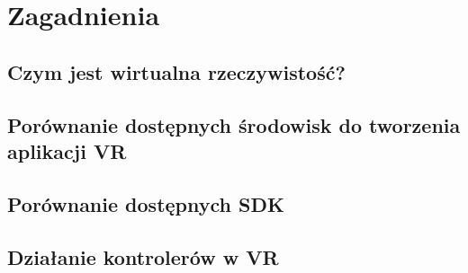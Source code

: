 \chapter{Zagadnienia}
\label{ch:zagadnienia}


\section{Czym jest wirtualna rzeczywistość?}
\label{sec:vr}

\section{Porównanie dostępnych środowisk do tworzenia aplikacji VR}
\label{sec:enviroment}

\section{Porównanie dostępnych SDK}
\label{sec:sdk}

\section{Działanie kontrolerów w VR}
\label{sec:kontroleryVR}
	
	